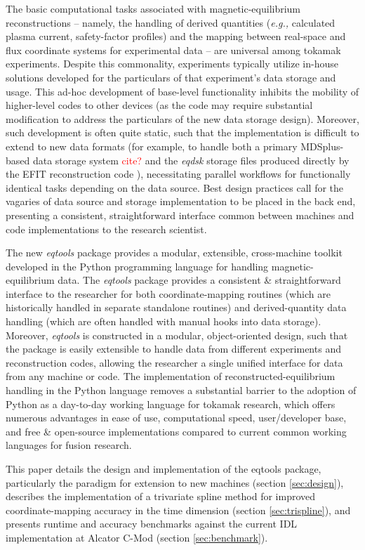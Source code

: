 \documentclass[12pt,floatfix,showpacs]{revtex4-1}
\newcommand{\eg}{\emph{e.g., }}
\newcommand{\note}[1]{\textcolor{red}{#1}}
\newcommand{\gnote}[1]{\marginpar{\textcolor{red}{\scriptsize{#1}}}}
\begin{document}
The basic computational tasks associated with magnetic-equilibrium reconstructions -- namely, the handling of derived quantities (\eg calculated plasma current, safety-factor profiles) and the mapping between real-space and flux coordinate systems for experimental data -- are universal among tokamak experiments.  Despite this commonality, experiments typically utilize in-house solutions developed for the particulars of that experiment's data storage and usage.  This ad-hoc development of base-level functionality inhibits the mobility of higher-level codes to other devices (as the code may require substantial modification to address the particulars of the new data storage design).  Moreover, such development is often quite static, such that the implementation is difficult to extend to new data formats (for example, to handle both a primary MDSplus-based data storage system \note{cite?} and the \emph{eqdsk} storage files produced directly by the EFIT reconstruction code \cite{Lao1985}), necessitating parallel workflows for functionally identical tasks depending on the data source.  Best design practices call for the vagaries of data source and storage implementation to be placed in the back end, presenting a consistent, straightforward interface common between machines and code implementations to the research scientist.

The new \emph{eqtools} package provides a modular, extensible, cross-machine toolkit developed in the Python programming language for handling magnetic-equilibrium data.  The \emph{eqtools} package provides a consistent \& straightforward interface to the researcher for both coordinate-mapping routines (which are historically handled in separate standalone routines) and derived-quantity data handling (which are often handled with manual hooks into data storage).  Moreover, \emph{eqtools} is constructed in a modular, object-oriented design, such that the package is easily extensible to handle data from different experiments and reconstruction codes, allowing the researcher a single unified interface for data from any machine or code.  The implementation of reconstructed-equilibrium handling in the Python language removes a substantial barrier to the adoption of Python as a day-to-day working language for tokamak research, which offers numerous advantages in ease of use, computational speed, user/developer base, and free \& open-source implementations compared to current common working languages for fusion research.\gnote{where to point to github?}

This paper details the design and implementation of the eqtools package, particularly the paradigm for extension to new machines (section \ref{sec:design}), describes the implementation of a trivariate spline method for improved coordinate-mapping accuracy in the time dimension (section \ref{sec:trispline}), and presents runtime and accuracy benchmarks against the current IDL implementation at Alcator C-Mod (section \ref{sec:benchmark}).
\end{document}
